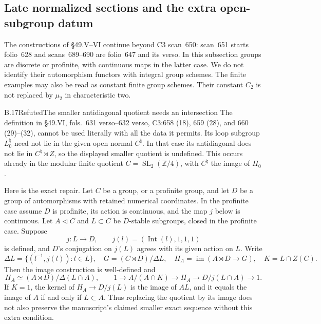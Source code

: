 \subsection{Late normalized sections and the extra open-subgroup datum}

The constructions of \S49.V--VI continue beyond C3 scan~650:
scan~651 starts folio~628 and scans~689--690 are folio~647
and its verso.  In this subsection groups are discrete or
profinite, with continuous maps in the latter case.
We do not identify their automorphism functors with integral
group schemes.  The finite examples may also be read as
constant finite group schemes.  Their constant \(C_2\) is
not replaced by \(\mu_2\) in characteristic two.

\begin{statement}{B.17}{Refuted}{The smaller antidiagonal quotient needs an intersection}
The definition in \S49.VI, fols.~631 verso--632 verso,
C3:658 (18), 659 (28), and 660 (29)--(32), cannot be used
literally with all the data it permits.  Its loop subgroup
\(L_0^\natural\) need not lie in the given open normal
\(C^\natural\).  In that case its antidiagonal does not
lie in \(C^\natural\rtimes Z\), so the displayed smaller
quotient is undefined.  This occurs already in the modular
finite quotient \(C=\operatorname{SL}_2(\mathbb Z/4)\),
with \(C^\natural\) the image of \(\Pi_0\).

Here is the exact repair.  Let \(C\) be a group, or a
profinite group, and let \(D\) be a group of automorphisms
with retained numerical coordinates.  In the profinite case
assume \(D\) is profinite, its action is continuous, and the
map \(j\) below is continuous.  Let \(A\triangleleft C\)
and \(L\subset C\) be \(D\)-stable subgroups, closed in the
profinite case.  Suppose
\[
 j:L\longrightarrow D,\qquad
 j(l)=(\operatorname{Int}(l),1,1,1)
\]
is defined, and \(D\)'s conjugation on \(j(L)\) agrees with
its given action on \(L\).  Write
\[
 \Delta L=\{(l^{-1},j(l)):l\in L\},\quad
 G=(C\rtimes D)/\Delta L,\quad
 H_A=\operatorname{im}(A\rtimes D\longrightarrow G),\quad
 K=L\cap Z(C).
\]
Then the image construction is well-defined and
\[
 H_A\simeq(A\rtimes D)/\Delta(L\cap A),\qquad
 1\longrightarrow A/(A\cap K)\longrightarrow H_A
 \longrightarrow D/j(L\cap A)\longrightarrow1.       \tag{B.17.1}
\]
If \(K=1\), the kernel of \(H_A\to D/j(L)\) is
the image of \(AL\), and it equals the image of \(A\)
if and only if \(L\subset A\).  Thus replacing the
quotient by its image does not also preserve the manuscript's
claimed smaller exact sequence without this extra condition.


\end{statement}
